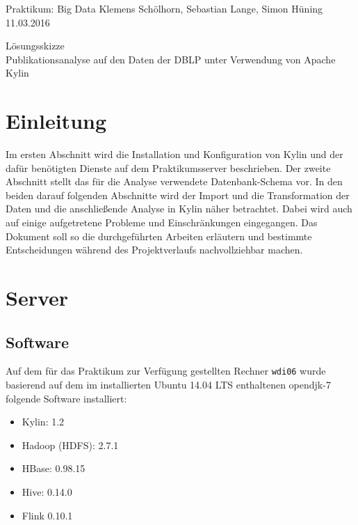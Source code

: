 \documentclass[a4paper,11pt,utf8]{scrartcl}
\begin{document}
\pagestyle{empty}

\noindent
Praktikum: Big Data \hfill Klemens Schölhorn, Sebastian Lange, Simon Hüning \hfill 11.03.2016\vspace{-.4cm}\\
\begin{center}
\huge\textsf{Lösungsskizze}\vspace{.1cm}\\
\large Publikationsanalyse auf den Daten der DBLP unter Verwendung von Apache Kylin
\end{center}

\section*{Einleitung}

Im ersten Abschnitt wird die Installation und Konfiguration von Kylin und der dafür benötigten Dienste auf dem Praktikumsserver beschrieben. Der zweite Abschnitt stellt das für die Analyse verwendete Datenbank-Schema vor. In den beiden darauf folgenden Abschnitte wird der Import und die Transformation der Daten und die anschließende Analyse in Kylin näher betrachtet. Dabei wird auch auf einige aufgetretene Probleme und Einschränkungen eingegangen. Das Dokument soll so die durchgeführten Arbeiten erläutern und bestimmte Entscheidungen während des Projektverlaufs nachvollziehbar machen.

\section{Server}

\subsection{Software}

Auf dem für das Praktikum zur Verfügung gestellten Rechner \texttt{wdi06} wurde basierend auf dem im installierten Ubuntu 14.04 LTS enthaltenen opendjk-7 folgende Software installiert:

\begin{itemize}
    \item Kylin: 1.2
    \item Hadoop (HDFS): 2.7.1
    \item HBase: 0.98.15
    \item Hive: 0.14.0
    \item Flink 0.10.1
\end{itemize}
\end{document}
